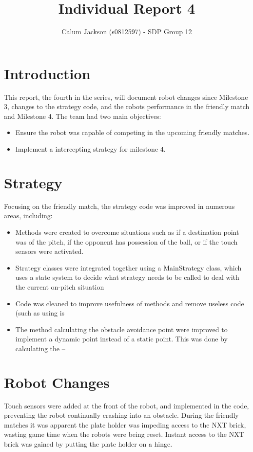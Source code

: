 \documentclass[conference,12pt]{IEEEtran}
\begin{document}
	
\title{Individual Report 4}

\author{Calum Jackson (s0812597) - 
SDP Group 12}

\maketitle


\pagebreak

\section{Introduction}
This report, the fourth in the series, will document robot changes since Milestone 3, changes to the strategy code, and the robots performance in the friendly match and Milestone 4. The team had two main objectives:
\begin{itemize}
\item Ensure the robot was capable of competing in the upcoming friendly matches.
\item Implement a intercepting strategy for milestone 4.
\end{itemize}

\section{Strategy}
Focusing on the friendly match, the strategy code was improved in numerous areas, including:
\begin{itemize}
\item Methods were created to overcome situations such as if a destination point was of the pitch, if the opponent has possession of the ball, or if the touch sensors were activated.
\item Strategy classes were integrated together using a MainStrategy class, which uses a state system to decide what strategy needs to be called to deal with the current on-pitch situation
\item Code was cleaned to improve usefulness of methods and remove useless code (such as using is
\item The method calculating the obstacle avoidance point were improved to implement a dynamic point instead of a static point. This was done by calculating the --
\end{itemize}

\section{Robot Changes}
Touch sensors were added at the front of the robot, and implemented in the code, preventing the robot continually crashing into an obstacle. During the friendly matches it was apparent the plate holder was impeding access to the NXT brick, wasting game time when the robots were being reset. Instant access to the NXT brick was gained by putting the plate holder on a hinge.
\end{document}
